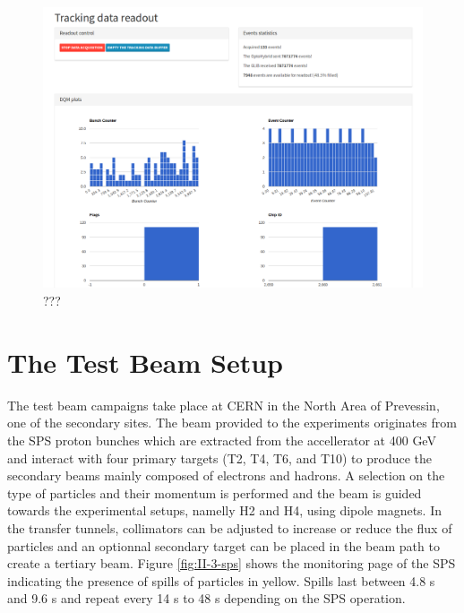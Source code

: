       \begin{figure}[h!]
        \centering
        \includegraphics[width=\textwidth]{img/II-3-test-beam/app-tk.png}
        \caption{???}
        \label{fig:II-3-app-tk}
      \end{figure}

  \section{The Test Beam Setup}

    The test beam campaigns take place at CERN in the North Area of Prevessin, one of the secondary sites. The beam provided to the experiments originates from the SPS proton bunches which are extracted from the accellerator at 400 GeV and interact with four primary targets (T2, T4, T6, and T10) to produce the secondary beams mainly composed of electrons and hadrons. A selection on the type of particles and their momentum is performed and the beam is guided towards the experimental setups, namelly H2 and H4, using dipole magnets. In the transfer tunnels, collimators can be adjusted to increase or reduce the flux of particles and an optionnal secondary target can be placed in the beam path to create a tertiary beam. Figure \ref{fig:II-3-sps} shows the monitoring page of the SPS indicating the presence of spills of particles in yellow. Spills last between 4.8 s and 9.6 s and repeat every 14 s to 48 s depending on the SPS operation. \\

